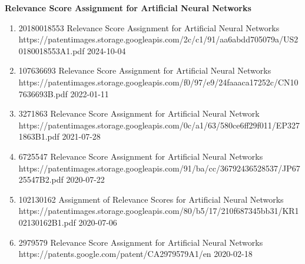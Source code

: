 \headedsection %
{\bf Relevance Score Assignment for Artificial Neural Networks}
{
    \ifdefined\shortcv
        {}
    \else
        {
            \begin{enumerate}
                \item [] 
                                {20180018553}
                                {Relevance Score Assignment for Artificial Neural Networks }
                                {https://patentimages.storage.googleapis.com/2c/c1/91/aa6abdd705079a/US20180018553A1.pdf}
                                {2024-10-04}  

                \item[] 
                                {107636693}
                                {Relevance Score Assignment for Artificial Neural Networks}
                                {https://patentimages.storage.googleapis.com/f0/97/e9/24faaaca17252c/CN107636693B.pdf}
                                {2022-01-11}

                \item [] 
                                {3271863}
                                {Relevance Score Assignment for Artificial Neural Network}
                                {https://patentimages.storage.googleapis.com/0c/a1/63/580ce6ff29f011/EP3271863B1.pdf}
                                {2021-07-28}

                \item [] 
                                {6725547}
                                {Relevance Score Assignment for Artificial Neural Networks}
                                {https://patentimages.storage.googleapis.com/91/ba/cc/36792436528537/JP6725547B2.pdf}
                                {2020-07-22}

                \item [] 
                                {102130162}
                                {Assignment of Relevance Scores for Artificial Neural Networks}
                                {https://patentimages.storage.googleapis.com/80/b5/17/210f687345bb31/KR102130162B1.pdf}
                                {2020-07-06}

                \item [] 
                                {2979579}
                                {Relevance Score Assignment for Artificial Neural Networks}
                                {https://patents.google.com/patent/CA2979579A1/en}
                                {2020-02-18}


\end{enumerate}}}
